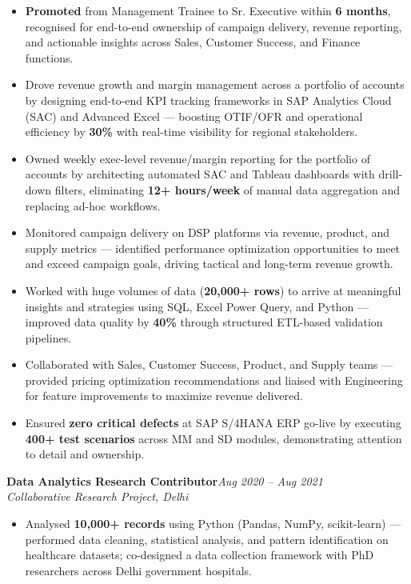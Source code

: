 \documentclass[10pt, letterpaper]{article}
\newcommand{\role}[3]{%
  \vspace{2pt}%
  {\bfseries #1}\hfill{\small\color{muted}\textit{#3}}\\[-2pt]%
  {\small\color{muted}\textit{#2}}%
}
\begin{document}
\begin{itemize}
  \item \textbf{Promoted} from Management Trainee to Sr. Executive within \textbf{6 months}, recognised for end-to-end ownership of campaign delivery, revenue reporting, and actionable insights across Sales, Customer Success, and Finance functions.
  \item Drove revenue growth and margin management across a portfolio of accounts by designing end-to-end KPI tracking frameworks in SAP Analytics Cloud (SAC) and Advanced Excel — boosting OTIF/OFR and operational efficiency by \textbf{30\%} with real-time visibility for regional stakeholders.
  \item Owned weekly exec-level revenue/margin reporting for the portfolio of accounts by architecting automated SAC and Tableau dashboards with drill-down filters, eliminating \textbf{12+ hours/week} of manual data aggregation and replacing ad-hoc workflows.
  \item Monitored campaign delivery on DSP platforms via revenue, product, and supply metrics — identified performance optimization opportunities to meet and exceed campaign goals, driving tactical and long-term revenue growth.
  \item Worked with huge volumes of data (\textbf{20,000+ rows}) to arrive at meaningful insights and strategies using SQL, Excel Power Query, and Python — improved data quality by \textbf{40\%} through structured ETL-based validation pipelines.
  \item Collaborated with Sales, Customer Success, Product, and Supply teams — provided pricing optimization recommendations and liaised with Engineering for feature improvements to maximize revenue delivered.
  \item Ensured \textbf{zero critical defects} at SAP S/4HANA ERP go-live by executing \textbf{400+ test scenarios} across MM and SD modules, demonstrating attention to detail and ownership.
\end{itemize}

\vspace{1pt}

\role{Data Analytics Research Contributor}{Collaborative Research Project, Delhi}{Aug 2020 – Aug 2021}

\begin{itemize}
  \item Analysed \textbf{10,000+ records} using Python (Pandas, NumPy, scikit-learn) — performed data cleaning, statistical analysis, and pattern identification on healthcare datasets; co-designed a data collection framework with PhD researchers across Delhi government hospitals.
\end{itemize}
\end{document}
